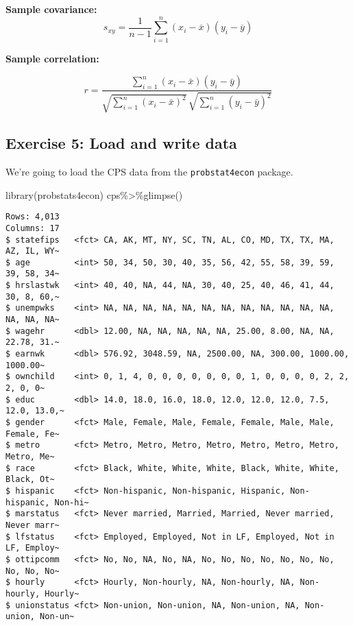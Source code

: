\documentclass[
  letterpaper,
  DIV=11,
  numbers=noendperiod]{scrartcl}
\newenvironment{Shaded}{\begin{snugshade}}{\end{snugshade}}
\newcommand{\FunctionTok}[1]{\textcolor[rgb]{0.28,0.35,0.67}{#1}}
\newcommand{\NormalTok}[1]{\textcolor[rgb]{0.00,0.23,0.31}{#1}}
\newcommand{\SpecialCharTok}[1]{\textcolor[rgb]{0.37,0.37,0.37}{#1}}
\begin{document}
\textbf{Sample covariance:}
\[s_{xy}=\frac{1}{n-1}\sum_{i=1}^n(x_i-\overline{x})(y_i-\overline{y})\]

\textbf{Sample correlation:}

\[r = \frac{\sum_{i=1}^n (x_i - \bar{x})(y_i - \bar{y})}{\sqrt{\sum_{i=1}^n (x_i - \bar{x})^2} \, \sqrt{\sum_{i=1}^n (y_i - \bar{y})^2}}\]

\subsection{Exercise 5: Load and write
data}\label{exercise-5-load-and-write-data}

We're going to load the CPS data from the \texttt{probstat4econ}
package.

\begin{Shaded}
\begin{Highlighting}[]
\FunctionTok{library}\NormalTok{(probstats4econ)}
\NormalTok{cps}\SpecialCharTok{\%\textgreater{}\%}\FunctionTok{glimpse}\NormalTok{()}
\end{Highlighting}
\end{Shaded}

\begin{verbatim}
Rows: 4,013
Columns: 17
$ statefips   <fct> CA, AK, MT, NY, SC, TN, AL, CO, MD, TX, TX, MA, AZ, IL, WY~
$ age         <int> 50, 34, 50, 30, 40, 35, 56, 42, 55, 58, 39, 59, 39, 58, 34~
$ hrslastwk   <int> 40, 40, NA, 44, NA, 30, 40, 25, 40, 46, 41, 44, 30, 8, 60,~
$ unempwks    <int> NA, NA, NA, NA, NA, NA, NA, NA, NA, NA, NA, NA, NA, NA, NA~
$ wagehr      <dbl> 12.00, NA, NA, NA, NA, NA, 25.00, 8.00, NA, NA, 22.78, 31.~
$ earnwk      <dbl> 576.92, 3048.59, NA, 2500.00, NA, 300.00, 1000.00, 1000.00~
$ ownchild    <int> 0, 1, 4, 0, 0, 0, 0, 0, 0, 0, 1, 0, 0, 0, 0, 2, 2, 2, 0, 0~
$ educ        <dbl> 14.0, 18.0, 16.0, 18.0, 12.0, 12.0, 12.0, 7.5, 12.0, 13.0,~
$ gender      <fct> Male, Female, Male, Female, Female, Male, Male, Female, Fe~
$ metro       <fct> Metro, Metro, Metro, Metro, Metro, Metro, Metro, Metro, Me~
$ race        <fct> Black, White, White, White, Black, White, White, Black, Ot~
$ hispanic    <fct> Non-hispanic, Non-hispanic, Hispanic, Non-hispanic, Non-hi~
$ marstatus   <fct> Never married, Married, Married, Never married, Never marr~
$ lfstatus    <fct> Employed, Employed, Not in LF, Employed, Not in LF, Employ~
$ ottipcomm   <fct> No, No, NA, No, NA, No, No, No, No, No, No, No, No, No, No~
$ hourly      <fct> Hourly, Non-hourly, NA, Non-hourly, NA, Non-hourly, Hourly~
$ unionstatus <fct> Non-union, Non-union, NA, Non-union, NA, Non-union, Non-un~
\end{verbatim}
\end{document}

